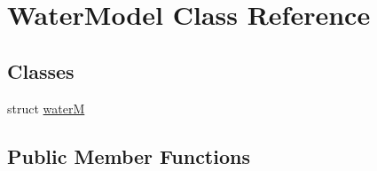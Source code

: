\hypertarget{classWaterModel}{\section{Water\-Model Class Reference}
\label{classWaterModel}
}
\subsection*{Classes}
\begin{DoxyCompactItemize}
\item 
struct \hyperlink{structWaterModel_1_1waterM}{water\-M}
\end{DoxyCompactItemize}
\subsection*{Public Member Functions}
